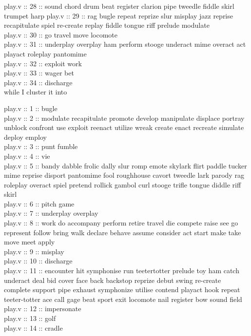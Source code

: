 \documentclass[12pt]{article}
\begin{document}
\begin{itemize}
	play.v :: 28 :: sound chord drum beat register clarion pipe tweedle fiddle skirl trumpet harp
	play.v :: 29 :: rag bugle repeat reprize slur misplay jazz reprise recapitulate spiel re-create replay fiddle tongue riff prelude modulate \\
	play.v :: 30 :: go travel move locomote \\
	play.v :: 31 :: underplay overplay ham perform stooge underact mime overact act playact roleplay pantomime \\
	play.v :: 32 :: exploit work \\
	play.v :: 33 :: wager bet \\
	play.v :: 34 :: discharge \\
	
	while I cluster it into
	
	play.v :: 1 :: bugle \\
	play.v :: 2 :: modulate recapitulate promote develop manipulate displace portray unblock confront use exploit reenact utilize wreak create enact recreate simulate deploy employ \\
	play.v :: 3 :: punt fumble\\
	play.v :: 4 :: vie\\
	play.v :: 5 :: bandy dabble frolic dally slur romp emote skylark flirt paddle tucker mime reprise disport pantomime fool roughhouse cavort tweedle lark parody rag roleplay overact spiel pretend rollick gambol curl stooge trifle tongue diddle riff skirl \\
	play.v :: 6 :: pitch game \\
	play.v :: 7 :: underplay overplay \\
	play.v :: 8 :: work do accompany perform retire travel die compete raise see go represent follow bring walk declare behave assume consider act start make take move meet apply \\
	play.v :: 9 :: misplay \\
	play.v :: 10 :: discharge \\
	play.v :: 11 :: encounter hit symphonise run teetertotter prelude toy ham catch underact deal bid cover face back backstop reprize debut swing re-create complete support pipe exhaust symphonize utilise contend playact hook repeat teeter-totter ace call gage beat sport exit locomote nail register bow sound field \\
	play.v :: 12 :: impersonate \\
	play.v :: 13 :: golf \\
	play.v :: 14 :: cradle \\

\end{itemize}
\end{document}

